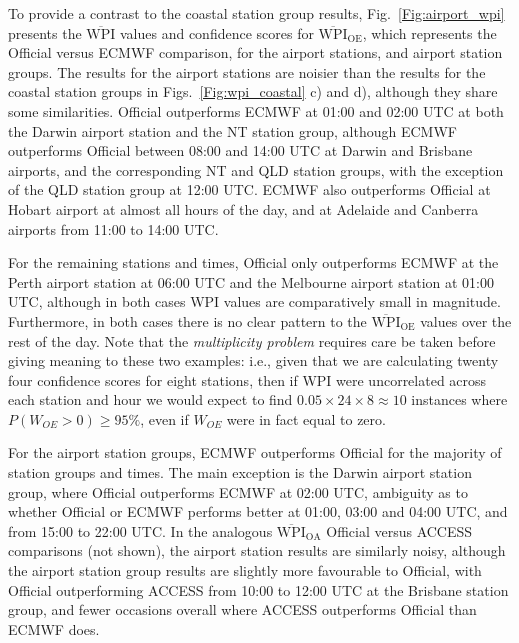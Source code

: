 \documentclass{ametsoc}
\begin{document}
To provide a contrast to the coastal station group results, Fig.~\ref{Fig:airport_wpi} presents the $\overline{\text{WPI}}$ values and confidence scores for $\overline{\text{WPI}}_\text{OE}$, which represents the Official versus ECMWF comparison, for the airport stations, and airport station groups. The results for the airport stations are noisier than the results for the coastal station groups in Figs.~\ref{Fig:wpi_coastal} c) and d), although they share some similarities. Official outperforms ECMWF at 01:00 and 02:00 UTC at both the Darwin airport station and the NT station group, although ECMWF outperforms Official between 08:00 and 14:00 UTC at Darwin and Brisbane airports, and the corresponding NT and QLD station groups, with the exception of the QLD station group at 12:00 UTC. ECMWF also outperforms Official at Hobart airport at almost all hours of the day, and at Adelaide and Canberra airports from 11:00 to 14:00 UTC. 

For the remaining stations and times, Official only outperforms ECMWF at the Perth airport station at 06:00 UTC and the Melbourne airport station at 01:00 UTC, although in both cases WPI values are comparatively small in magnitude. Furthermore, in both cases there is no clear pattern to the $\overline{\text{WPI}}_\text{OE}$ values over the rest of the day. Note that the \textit{multiplicity problem} \citep[p. 178]{wilks11} requires care be taken before giving meaning to these two examples: i.e., given that we are calculating twenty four confidence scores for eight stations, then if WPI were uncorrelated across each station and hour we would expect to find $0.05 \times 24 \times 8 \approx 10$ instances where $P\left(W_{OE}>0\right)\geq 95\%$, even if $W_{OE}$ were in fact equal to zero.

For the airport station groups, ECMWF outperforms Official for the majority of station groups and times. The main exception is the Darwin airport station group, where Official outperforms ECMWF at 02:00 UTC, ambiguity as to whether Official or ECMWF performs better at 01:00, 03:00 and 04:00 UTC, and from 15:00 to 22:00 UTC. In the analogous $\overline{\text{WPI}}_\text{OA}$ Official versus ACCESS comparisons (not shown), the airport station results are similarly noisy, although the airport station group results are slightly more favourable to Official, with Official outperforming ACCESS from 10:00 to 12:00 UTC at the Brisbane station group, and fewer occasions overall where ACCESS outperforms Official than ECMWF does. 
\end{document}
